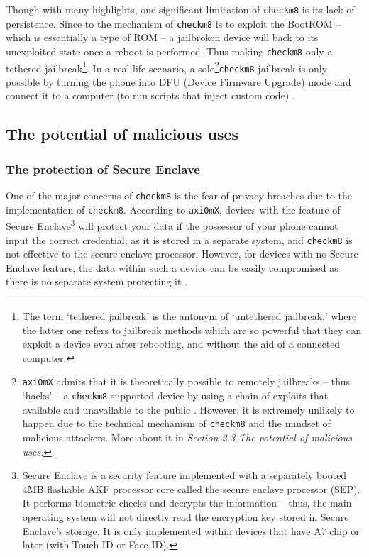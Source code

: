 \documentclass[10pt]{article}
\newcommand{\inlinecode}{\texttt}
\begin{document}
Though with many highlights, one significant limitation of \inlinecode{checkm8} is its lack of persistence. Since to the mechanism of \inlinecode{checkm8} is to exploit the BootROM -- which is essentially a type of ROM -- a jailbroken device will back to its unexploited state once a reboot is performed. Thus making \inlinecode{checkm8} only a tethered jailbreak\footnote{The term `tethered jailbreak' is the antonym of `untethered jailbreak,' where the latter one refers to jailbreak methods which are so powerful that they can exploit a device even after rebooting, and without the aid of a connected computer.}. In a real-life scenario, a solo\footnote{\inlinecode{axi0mX} admits that it is theoretically possible to remotely jailbreaks -- thus `hacks' -- a \inlinecode{checkm8} supported device by using a chain of exploits that available and unavailable to the public \cite{cite:3}. However, it is extremely unlikely to happen due to the technical mechanism of \inlinecode{checkm8} and the mindset of malicious attackers. More about it in \textit{Section 2.3 The potential of malicious uses}.}\inlinecode{checkm8} jailbreak is only possible by turning the phone into DFU (Device Firmware Upgrade) mode and connect it to a computer (to run scripts that inject custom code) .

\subsection{The potential of malicious uses}
\subsubsection{The protection of Secure Enclave}
One of the major concerns of \inlinecode{checkm8} is the fear of privacy breaches due to the implementation of \inlinecode{checkm8}. According to \inlinecode{axi0mX}, devices with the feature of Secure Enclave\footnote{Secure Enclave is a security feature implemented with a separately booted 4MB flashable AKF processor core called the secure enclave processor (SEP). It performs biometric checks and decrypts the information -- thus, the main operating system will not directly read the encryption key stored in Secure Enclave's storage. It is only implemented within devices that have A7 chip or later (with Touch ID or Face ID).} will protect your data if the possessor of your phone cannot input the correct credential; as it is stored in a separate system, and \inlinecode{checkm8} is not effective to the secure enclave processor. However, for devices with no Secure Enclave feature, the data within such a device can be easily compromised as there is no separate system protecting it \cite{cite:3}.
\end{document}

